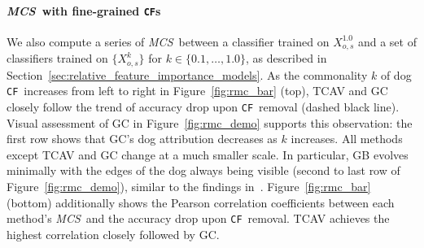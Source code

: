 \documentclass[twoside]{article}
\newcommand{\CF}{\texttt{CF}}
\newcommand{\MCS}{\textit{MCS}}
\begin{document}
\paragraph{\MCS~with fine-grained \CF s} We also compute a series of \MCS~between a classifier trained on $X_{o,s}^{1.0}$ and a set of classifiers trained on $\{X_{o,s}^k\}$ for $k \in \{0.1, \dots, 1.0\}$, as described in Section~\ref{sec:relative_feature_importance_models}. As the commonality $k$ of dog \CF~increases from left to right in Figure~\ref{fig:rmc_bar} (top), TCAV and GC closely follow the trend of accuracy drop upon \CF~removal (dashed black line). Visual assessment of GC in Figure~\ref{fig:rmc_demo} supports this observation: the first row shows that GC's dog attribution decreases as $k$ increases. All methods except TCAV and GC change at a much smaller scale. In particular, GB evolves minimally with the edges of the dog always being visible (second to last row of Figure~\ref{fig:rmc_demo}), similar to the findings in~\citet{Adebayo18,Nie18}. Figure~\ref{fig:rmc_bar} (bottom) additionally shows the Pearson correlation coefficients between each method's \MCS~and the accuracy drop upon \CF~removal. TCAV achieves the highest correlation closely followed by GC. 
\end{document}
